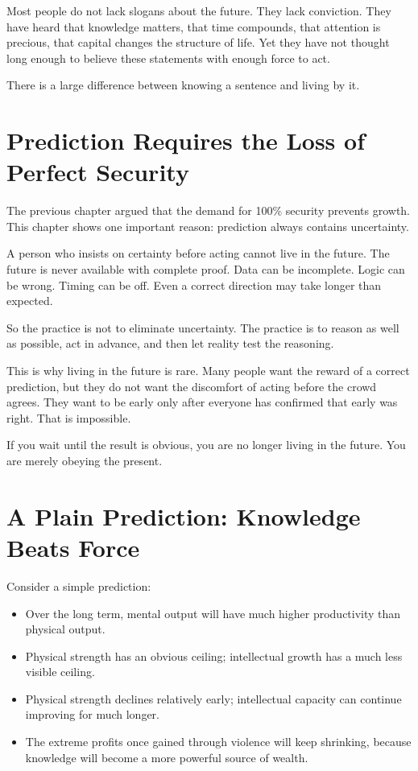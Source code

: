 Most people do not lack slogans about the future. They lack conviction. They have heard that knowledge matters, that time compounds, that attention is precious, that capital changes the structure of life. Yet they have not thought long enough to believe these statements with enough force to act.

There is a large difference between knowing a sentence and living by it.

\section*{Prediction Requires the Loss of Perfect Security}

The previous chapter argued that the demand for 100\% security prevents growth. This chapter shows one important reason: prediction always contains uncertainty.

A person who insists on certainty before acting cannot live in the future. The future is never available with complete proof. Data can be incomplete. Logic can be wrong. Timing can be off. Even a correct direction may take longer than expected.

So the practice is not to eliminate uncertainty. The practice is to reason as well as possible, act in advance, and then let reality test the reasoning.

This is why living in the future is rare. Many people want the reward of a correct prediction, but they do not want the discomfort of acting before the crowd agrees. They want to be early only after everyone has confirmed that early was right. That is impossible.

If you wait until the result is obvious, you are no longer living in the future. You are merely obeying the present.

\section*{A Plain Prediction: Knowledge Beats Force}

Consider a simple prediction:

\begin{itemize}
\item Over the long term, mental output will have much higher productivity than physical output.
\item Physical strength has an obvious ceiling; intellectual growth has a much less visible ceiling.
\item Physical strength declines relatively early; intellectual capacity can continue improving for much longer.
\item The extreme profits once gained through violence will keep shrinking, because knowledge will become a more powerful source of wealth.
\end{itemize}

